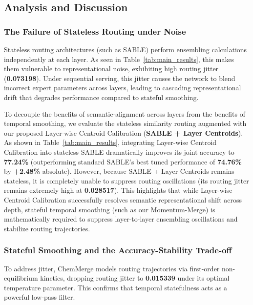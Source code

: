\subsection{Analysis and Discussion}

\subsubsection{The Failure of Stateless Routing under Noise}
Stateless routing architectures (such as SABLE) perform ensembling calculations independently at each layer. As seen in Table~\ref{tab:main_results}, this makes them vulnerable to representational noise, exhibiting high routing jitter (\textbf{0.073198}). Under sequential serving, this jitter causes the network to blend incorrect expert parameters across layers, leading to cascading representational drift that degrades performance compared to stateful smoothing.

To decouple the benefits of semantic-alignment across layers from the benefits of temporal smoothing, we evaluate the stateless similarity routing augmented with our proposed Layer-wise Centroid Calibration (\textbf{SABLE + Layer Centroids}). As shown in Table~\ref{tab:main_results}, integrating Layer-wise Centroid Calibration into stateless SABLE dramatically improves its joint accuracy to \textbf{77.24\%} (outperforming standard SABLE's best tuned performance of \textbf{74.76\%} by \textbf{+2.48\%} absolute). However, because SABLE + Layer Centroids remains stateless, it is completely unable to suppress routing oscillations (its routing jitter remains extremely high at \textbf{0.028517}). This highlights that while Layer-wise Centroid Calibration successfully resolves semantic representational shift across depth, stateful temporal smoothing (such as our Momentum-Merge) is mathematically required to suppress layer-to-layer ensembling oscillations and stabilize routing trajectories.

\subsubsection{Stateful Smoothing and the Accuracy-Stability Trade-off}
To address jitter, ChemMerge models routing trajectories via first-order non-equilibrium kinetics, dropping routing jitter to \textbf{0.015339} under its optimal temperature parameter. This confirms that temporal statefulness acts as a powerful low-pass filter. 

